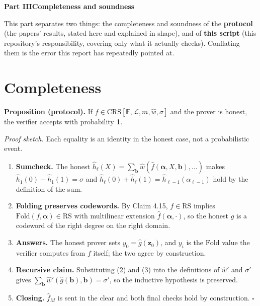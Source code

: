 \documentclass[11pt,a4paper]{article}
\newcommand{\Fold}{\mathrm{Fold}}
\newcommand{\RS}{\mathrm{RS}}
\newcommand{\CRS}{\mathrm{CRS}}
\begin{document}
\clearpage
\begin{center}{\large\bfseries Part III\quad Completeness and soundness}\end{center}
\vspace{-0.5em}
\noindent{\color{rule}\rule{\linewidth}{0.6pt}}

\medskip
This part separates two things: the completeness and soundness of the \textbf{protocol} (the papers'
results, stated here and explained in shape), and of \textbf{this script} (this repository's
responsibility, covering only what it actually checks). Conflating them is the error this report has
repeatedly pointed at.

\section{Completeness}

\textbf{Proposition (protocol).} If $f\in\CRS[\mathbb{F},\mathcal{L},m,\hat w,\sigma]$ and the prover
is honest, the verifier accepts with probability \textbf{1}.

\emph{Proof sketch.} Each equality is an identity in the honest case, not a probabilistic event.

\begin{enumerate}
  \item \textbf{Sumcheck.} The honest $\hat h_{\ell}(X)=\sum_{\boldsymbol b}
  \hat w(\hat f(\boldsymbol\alpha,X,\boldsymbol b),\dots)$ makes
  $\hat h_{1}(0)+\hat h_{1}(1)=\sigma$ and
  $\hat h_{\ell}(0)+\hat h_{\ell}(1)=\hat h_{\ell-1}(\alpha_{\ell-1})$ hold by the definition of the
  sum.
  \item \textbf{Folding preserves codewords.} By Claim 4.15, $f\in\RS$ implies
  $\Fold(f,\boldsymbol\alpha)\in\RS$ with multilinear extension $\hat f(\boldsymbol\alpha,\cdot)$, so
  the honest $g$ is a codeword of the right degree on the right domain.
  \item \textbf{Answers.} The honest prover sets $y_{0}=\hat g(\boldsymbol z_{0})$, and $y_{i}$ is
  the $\Fold$ value the verifier computes from $f$ itself; the two agree by construction.
  \item \textbf{Recursive claim.} Substituting (2) and (3) into the definitions of $\hat w'$ and
  $\sigma'$ gives $\sum_{\boldsymbol b}\hat w'(\hat g(\boldsymbol b),\boldsymbol b)=\sigma'$, so the
  inductive hypothesis is preserved.
  \item \textbf{Closing.} $\hat f_{M}$ is sent in the clear and both final checks hold by
  construction. \hfill$\square$
\end{enumerate}
\end{document}
